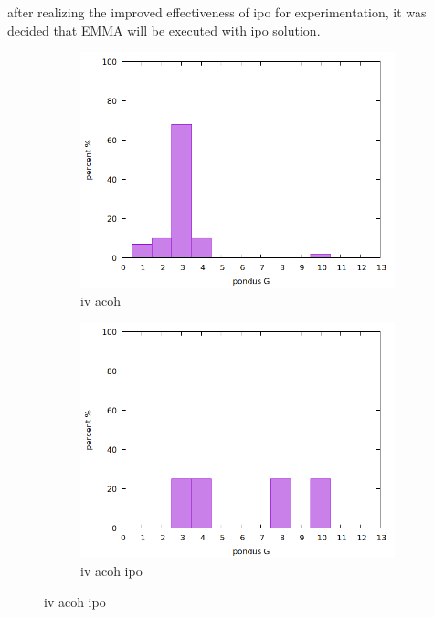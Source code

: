 after realizing the improved effectiveness of \gls{ipo} for experimentation, 
it was decided that EMMA will be executed with \gls{ipo} solution.
\begin{figure}
    \centering
    \begin{subfigure}{.3\textwidth}
        \includegraphics[width=\textwidth]{Pics/iv/iv-199-acoh.png}
        \caption{iv acoh} \label{fig:iv-acoh}
    \end{subfigure}
    \begin{subfigure}{.3\textwidth}
        \includegraphics[width=\textwidth]{Pics/iv/iv-201-acoh-ipo.png}
        \caption{iv acoh ipo} \label{fig:iv-acoh-ipo}

\end{subfigure}
\end{figure}
